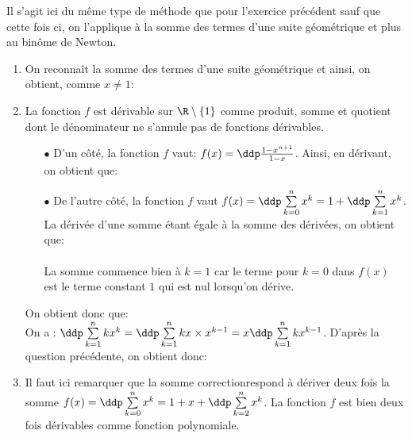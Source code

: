 \begin{correction}  \; Il s'agit ici du m\^{e}me type de m\'ethode que pour l'exercice pr\'ec\'edent sauf que cette fois ci, on l'applique \`{a} la somme des termes d'une suite g\'eom\'etrique et plus au bin\^{o}me de Newton.
\begin{enumerate}
\item On reconna\^{i}t la somme des termes d'une suite g\'eom\'etrique et ainsi, on obtient, comme $x\not= 1$:\\
\noindent  {}
\item La fonction $f$ est d\'erivable sur $\R\setminus\lbrace 1\rbrace$ comme produit, somme et quotient dont le d\'enominateur ne s'annule pas de fonctions d\'erivables. 
\begin{itemize}
\item[$\bullet$] D'un c\^{o}t\'e, la fonction $f$ vaut: $f(x)=\ddp\frac{1-x^{n+1}}{1-x}$. Ainsi, en d\'erivant, on obtient que:\\
\noindent {}
\item[$\bullet$] De l'autre c\^{o}t\'e, la fonction $f$ vaut $f(x)=\ddp \sum\limits_{k=0}^{n} x^k=1+\ddp \sum\limits_{k=1}^{n} x^k$. La d\'eriv\'ee d'une somme \'etant \'egale \`{a} la somme des d\'eriv\'ees, on obtient que:\\
\noindent {} \\
\noindent \warning La somme commence bien \`{a} $k=1$ car le terme pour $k=0$ dans $f(x)$ est le terme constant $1$ qui est nul lorsqu'on d\'erive.
\end{itemize} 
On obtient donc que: \\
On a : $\ddp \sum\limits_{k=1}^{n} k x^{k}=\ddp \sum\limits_{k=1}^{n} k x\times x^{k-1}=x\ddp \sum\limits_{k=1}^{n} k x^{k-1}$. D'apr\`{e}s la question pr\'ec\'edente, on obtient donc:\begin{center}
\end{center}
\item Il faut ici remarquer que la somme correctionrespond \`{a} d\'eriver deux fois la somme $f(x)=\ddp \sum\limits_{k=0}^{n} x^k=1+x+\ddp \sum\limits_{k=2}^{n} x^k$. La fonction $f$ est bien deux fois d\'erivables comme fonction polynomiale.

\end{enumerate}
\end{correction}
